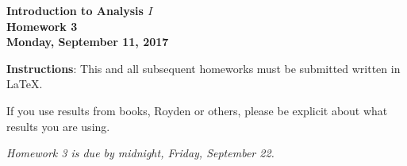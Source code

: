 \documentclass{article}%
\begin{document}
\begin{center}
\textbf{Introduction to Analysis $I$\\Homework 3\\Monday, September 11, 2017}\bigskip
\end{center}

\noindent\textbf{Instructions}: This and all subsequent homeworks must be submitted written in \LaTeX.

\noindent If you use results from books, Royden or others, please be explicit about what results you are using.



\begin{center}
\emph{Homework 3 is due by midnight, Friday, September 22.}
\end{center} 
\medskip
\end{document}
